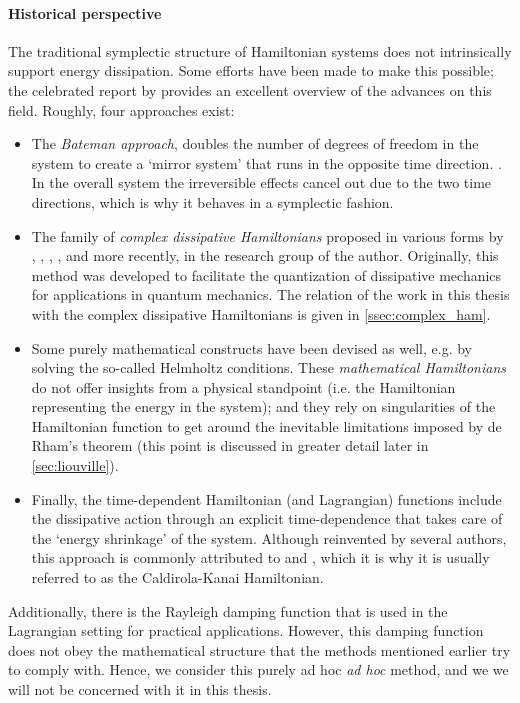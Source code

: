 \paragraph{Historical perspective} The traditional symplectic structure of Hamiltonian systems does not intrinsically support energy dissipation. Some efforts have been made to make this possible; the celebrated report by \citet{Dekker1981} provides an excellent overview of the advances on this field. Roughly, four approaches exist:
\begin{itemize}
    \item The \emph{Bateman approach}, doubles the number of degrees of freedom in the system to create a `mirror system' that runs in the opposite time direction. \cite{Bateman1931}. In the overall system the irreversible effects cancel out due to the two time directions, which is why it behaves in a symplectic fashion.
    \item The family of \emph{complex dissipative Hamiltonians} proposed in various forms by \citet{Bopp1974}, \citet{Dekker1975}, \citet{Dedene1980}, \citet{Rajeev2007}, and more recently, \citet{Hutters2020b} in the research group of the author. Originally, this method was developed to facilitate the quantization of dissipative mechanics for applications in quantum mechanics. The relation of the work in this thesis with the complex dissipative Hamiltonians is given in \cref{ssec:complex_ham}.
    \item Some purely mathematical constructs have been devised as well, e.g. by \citet{Havas1957} solving the so-called Helmholtz conditions. These \emph{mathematical Hamiltonians} do not offer insights from a physical standpoint (i.e. the Hamiltonian representing the energy in the system); and they rely on singularities of the Hamiltonian function to get around the inevitable limitations imposed by de Rham's theorem (this point is discussed in greater detail later in \cref{sec:liouville}).
    \item Finally, the time-dependent Hamiltonian (and Lagrangian) functions include the dissipative action through an explicit time-dependence that takes care of the `energy shrinkage' of the system. Although reinvented by several authors, this approach is commonly attributed to \citet{Caldirola1941} and \citet{Kanai1948}, which it is why it is usually referred to as the Caldirola-Kanai Hamiltonian.
\end{itemize}
Additionally, there is the Rayleigh damping function that is used in the Lagrangian setting for practical applications. However, this damping function does not obey the mathematical structure that the methods mentioned earlier try to comply with. Hence, we consider this purely ad hoc \emph{ad hoc} method, and we we will not be concerned with it in this thesis. \cite{Goldstein2011}

